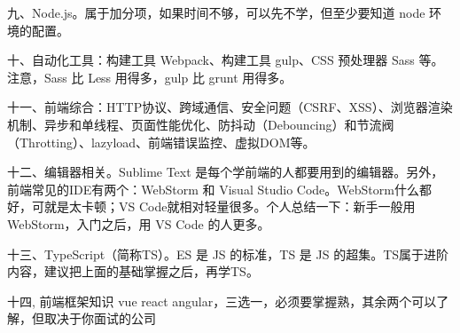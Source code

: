 \documentclass[letterpaper,12pt,english]{sphinxmanual}
\begin{document}
九、Node.js。属于加分项，如果时间不够，可以先不学，但至少要知道 node 环境的配置。

十、自动化工具：构建工具 Webpack、构建工具 gulp、CSS 预处理器 Sass 等。注意，Sass 比 Less 用得多，gulp 比 grunt 用得多。

十一、前端综合：HTTP协议、跨域通信、安全问题（CSRF、XSS）、浏览器渲染机制、异步和单线程、页面性能优化、防抖动（Debouncing）和节流阀（Throtting）、lazyload、前端错误监控、虚拟DOM等。

十二、编辑器相关。Sublime Text 是每个学前端的人都要用到的编辑器。另外，前端常见的IDE有两个：WebStorm 和 Visual Studio Code。WebStorm什么都好，可就是太卡顿；VS Code就相对轻量很多。个人总结一下：新手一般用 WebStorm，入门之后，用 VS Code 的人更多。

十三、TypeScript（简称TS）。ES 是 JS 的标准，TS 是 JS 的超集。TS属于进阶内容，建议把上面的基础掌握之后，再学TS。

十四, 前端框架知识 vue react angular，三选一，必须要掌握熟，其余两个可以了解，但取决于你面试的公司
\end{document}
